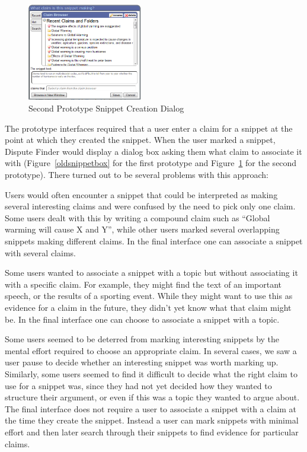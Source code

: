 \documentclass{www2010-submission}
\begin{document}
\begin{figure}[t]
\begin{center}
	\includegraphics[width=5cm]{../screenshots/newsnip_browseopen.png}
	\caption{Second Prototype Snippet Creation Dialog}
	\label{secondsnippetbox}
\end{center}
\end{figure}

The prototype interfaces required that a user enter a claim for a snippet at the point at which they created the snippet. When the user marked a snippet, Dispute Finder would display a dialog box asking them what claim to associate it with (Figure~\ref{oldsnippetbox} for the first prototype and Figure~\ref{secondsnippetbox} for the second prototype). There turned out to be several problems with this approach:

Users would often encounter a snippet that could be interpreted as making several interesting claims and were confused by the need to pick only one claim. Some users dealt with this by writing a compound claim such as ``Global warming will cause X and Y'', while other users marked several overlapping snippets making different claims. In the final interface one can associate a snippet with several claims.

Some users wanted to associate a snippet with a topic but without associating it with a specific claim. For example, they might find the text of an important speech, or the results of a sporting event. While they might want to use this as evidence for a claim in the future, they didn't yet know what that claim might be. In the final interface one can choose to associate a snippet with a topic.

Some users seemed to be deterred from marking interesting snippets by the mental effort required to choose an appropriate claim. In several cases, we saw a user pause to decide whether an interesting snippet was worth marking up. Similarly, some users seemed to find it difficult to decide what the right claim to use for a snippet was, since they had not yet decided how they wanted to structure their argument, or even if this was a topic they wanted to argue about. The final interface does not require a user to associate a snippet with a claim at the time they create the snippet. Instead a user can mark snippets with minimal effort and then later search through their snippets to find evidence for particular claims.
\end{document}

